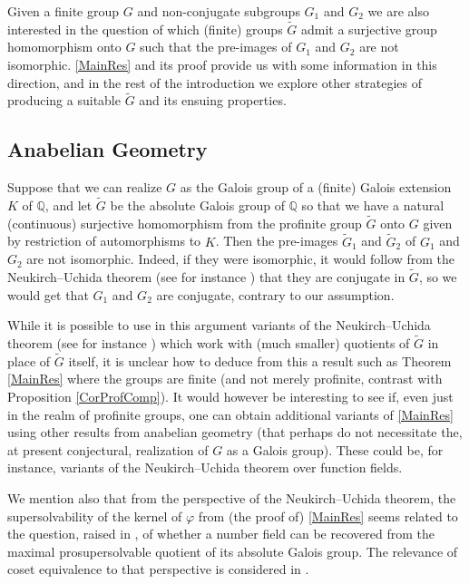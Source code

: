 \documentclass[11pt]{amsart}
\numberwithin{equation}{section}
\begin{document}
Given a finite group $G$ and non-conjugate subgroups $G_1$ and $G_2$ we are also interested in the question of which (finite) groups $\widetilde G$ admit a surjective group homomorphism onto $G$ such that the pre-images of $G_1$ and $G_2$ are not isomorphic. \cref{MainRes} and its proof provide us with some information in this direction, and in the rest of the introduction we explore other strategies of producing a suitable $\widetilde G$ and its ensuing properties.

\subsection{Anabelian Geometry}

Suppose that we can realize $G$ as the Galois group of a (finite) Galois extension $K$ of $\mathbb Q$, and let $\widetilde G$ be the absolute Galois group of $\mathbb Q$ so that we have a natural (continuous) surjective homomorphism from the profinite group $\widetilde G$ onto $G$ given by restriction of automorphisms to $K$. Then the pre-images $\widetilde{G}_1$ and $\widetilde G_2$ of $G_1$ and $G_2$ are not isomorphic. Indeed, if they were isomorphic, it would follow from the Neukirch--Uchida theorem (see for instance \cite{KS}) that they are conjugate in $\widetilde G$, so we would get that $G_1$ and $G_2$ are conjugate, contrary to our assumption.

While it is possible to use in this argument variants of the Neukirch--Uchida theorem (see for instance \cite[Introduction]{KS}) which work with (much smaller) quotients of $\widetilde G$ in place of $\widetilde G$ itself, it is unclear how to deduce from this a result such as Theorem \ref{MainRes} where the groups are finite (and not merely profinite, contrast with Proposition \ref{CorProfComp}). It would however be interesting to see if, even just in the realm of profinite groups, one can obtain additional variants of \cref{MainRes} using other results from anabelian geometry (that perhaps do not necessitate the, at present conjectural, realization of $G$ as a Galois group). These could be, for instance, variants of the Neukirch--Uchida theorem over function fields.

We mention also that from the perspective of the Neukirch--Uchida theorem, the supersolvability of the kernel of $\varphi$ from (the proof of) \cref{MainRes} seems related to the question, raised in \cite{KS}, of whether a number field can be recovered from the maximal prosupersolvable quotient of its absolute Galois group. The relevance of coset equivalence to that perspective is considered in \cite{GM}.
\end{document}
